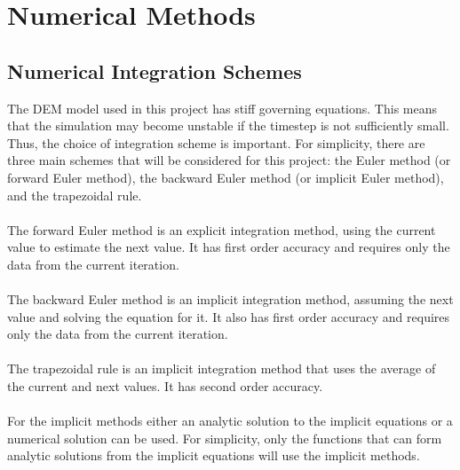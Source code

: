 \documentclass[a4paper,11pt,titlepage]{report}
\begin{document}
\chapter{Numerical Methods}
\label{ch:Numerical Methods}
\section{Numerical Integration Schemes}
The DEM model used in this project has stiff governing equations. This means that the simulation may become unstable if the timestep is not sufficiently small. Thus, the choice of integration scheme is important. For simplicity, there are three main schemes that will be considered for this project: the Euler method (or forward Euler method), the backward Euler method (or implicit Euler method), and the trapezoidal rule.
\\\\The forward Euler method is an explicit integration method, using the current value to estimate the next value. It has first order accuracy and requires only the data from the current iteration.
\\\\The backward Euler method is an implicit integration method, assuming the next value and solving the equation for it. It also has first order accuracy and requires only the data from the current iteration.
\\\\The trapezoidal rule is an implicit integration method that uses the average of the current and next values. It has second order accuracy.
\\\\For the implicit methods either an analytic solution to the implicit equations or a numerical solution can be used. For simplicity, only the functions that can form analytic solutions from the implicit equations will use the implicit methods.
\end{document}
